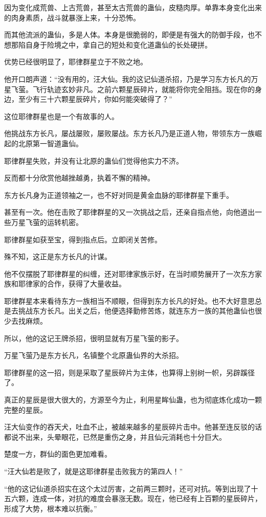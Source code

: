 \begin{this_body}
因为变化成荒兽、上古荒兽，甚至太古荒兽的蛊仙，皮糙肉厚。单靠本身变化出来的肉身素质，战斗就暴涨上来，十分恐怖。

而其他流派的蛊仙，多是人体。本身是很脆弱的，即便是有强大的防御手段，也不想那陷自身于险境之中，拿自己的短处和变化道蛊仙的长处硬拼。

优势已经很明显了，耶律群星立于不败之地。

他开口朗声道：“没有用的，汪大仙。我的这记仙道杀招，乃是学习东方长凡的万星飞萤。飞行轨迹玄妙非凡。之前六颗星辰碎片，就能将你完全阻挡。现在你的身边，至少有三十六颗星辰碎片，你如何能突破得了？”

这位耶律群星也是一个有故事的人。

他挑战东方长凡，屡战屡败，屡败屡战。东方长凡乃是正道人物，带领东方一族崛起的北原第一智道蛊仙。

耶律群星失败，并没有让北原的蛊仙们觉得他实力不济。

反而都十分欣赏他越挫越勇，执着不懈的精神。

东方长凡身为正道领袖之一，也不好对同是黄金血脉的耶律群星下重手。

甚至有一次。他在击败了耶律群星的又一次挑战之后，还亲自指点他，向他道出一些万星飞萤的运转机密。

耶律群星如获至宝，得到指点后。立即闭关苦修。

殊不知，这正是东方长凡的计谋。

他不仅摆脱了耶律群星的纠缠，还对耶律家族示好，在当时顺势展开了一次东方家族和耶律家的合作，获得了大量收益。

耶律群星本来看待东方一族相当不顺眼，但得到东方长凡的好处。也不大好意思总是去挑战东方长凡。出关之后，他便选择勤修苦炼，就连东方一族的其他蛊仙也很少去找麻烦。

所以，他的这记王牌杀招，很明显就有万星飞萤的影子。

万星飞萤乃是东方长凡，名镇整个北原蛊仙界的大杀招。

耶律群星的这一招，则是采取了星辰碎片为主体，也算得上别树一帜，另辟蹊径了。

真正的星辰是很大很大的，方源至今为止，利用星眸仙蛊，也为彻底炼化成功一颗完整的星辰。

汪大仙变作的吞天犬，吐血不止，被越来越多的星辰碎片击中。他甚至连反驳的话都说不出来，头晕眼花，已然是重伤之身，并且仙元消耗也十分巨大。

楚度一方，群仙的面色更加难看。

“汪大仙若是败了，就是这耶律群星击败我方的第四人！”

“他的这记仙道杀招实在这个太过厉害，之前两三颗时，还可对抗。等到出现了十五六颗，连成一体，对抗的难度会暴涨无数。现在，他已经有上百颗的星辰碎片，形成了大势，根本难以抗衡。”


\end{this_body}

